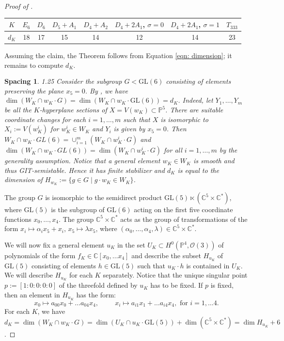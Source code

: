 \documentclass[10pt,a4paper]{amsart}
\newtheorem{spacing}{Spacing}
\newcommand{\GL}{\mathrm{GL}}
\newcommand{\bC}{\mathbb{C}}
\newcommand{\bP}{\mathbb{P}}
\newcommand{\calO}{\mathcal{O}}
\begin{document}
\begin{proof}[Proof of ]
    \begin{table}[h!]
\centering
\begin{tabular}{c|c|c|c|c|c|c|c}

$K$ & $E_6$ & $D_6$ & $D_5+A_1$& $D_4+A_2$ & $D_4+2A_1$, $\sigma=0$ & $D_4+2A_1$, $\sigma=1$ & $T_{333}$ \\ \hline
$d_K$   & 18   & 17   &  15  & 14   & 12   & 14 & 23\\ 
\end{tabular}

\label{tab: dK counts}
\end{table}
    
   Assuming the claim, the Theorem follows from Equation \ref{eqn: dimension}; it remains to compute $d_K$.
    
    \medskip
    \begin{spacing}{1.25}
    Consider the subgroup $G<\GL(6)$ consisting of elements preserving the plane $x_5=0$. By , we have $\dim(W_K\cap w_K\cdot G)=\dim(W_K\cap w_K\cdot\GL(6))=d_K$.
    Indeed, let $Y_1,\ldots,Y_m$ be all the $K$-hyperplane sections of $X=V(w_K)\subset \bP^5$. There are suitable coordinate changes for each $i=1,\ldots,m$ such that $X$ is isomorphic to $X_i:=V(w_K^i)$ for $w_K^i\in W_K$ and $Y_i$ is given by $x_5=0$. Then  $W_K\cap w_K\cdot GL(6)=\cup_{i=1}^m(W_K\cap w_K^i\cdot G)$ and $\dim(W_K\cap w_K\cdot GL(6))=\dim(W_K\cap w_K^i\cdot G)$ for all $i=1,\ldots,m$ by the generality assumption.
    Notice that a general element $w_K\in W_K$ is smooth and thus GIT-semistable. Hence it has finite stabilizer and $d_K$ is equal to the dimension of $H_{w_K}:=\{g\in G \mid g\cdot w_K\in W_K\}$.
    \end{spacing}
    
    The group $G$ is isomorphic to the semidirect product $\GL(5)\ltimes(\bC^5\times \bC^*)$, where $\GL(5)$ is the subgroup of $\GL(6)$ acting on the first five coordinate functions $x_0,\ldots,x_4$. 
    The group $\bC^5\times \bC^*$ acts as the group of transformations of the form $x_i\mapsto \alpha_ix_5+x_i$, $x_5\mapsto \lambda x_5$, where $(\alpha_0,\ldots,\alpha_4,\lambda)\in \bC^5\times \bC^*$.
    
    We will now fix a general element $u_K$ in the set $U_K\subset H^0(\bP^4,\calO(3))$ of polynomials of the form $f_K\in \bC[x_0,\dots x_4]$ and describe the subset $H_{u_K}$ of $\GL(5)$ consisting of elements $h\in\GL(5)$ such that $u_K\cdot h$ is contained in $U_K$.  We will describe $H_{u_K}$ for each $K$ separately.  
    Notice that the unique singular point $p:=[1:0:0:0:0]$ of the threefold defined by $u_K$ has to be fixed. If $p$ is fixed, then an element in $H_{u_K}$ has the form: 
    $$x_0\mapsto a_{00}x_0+\ldots a_{04}x_4, \hspace{1cm} x_i\mapsto a_{i1}x_1+\ldots a_{i4}x_4, \text{ for } i=1,\dots 4.$$ For each $K$, we have $d_K=\dim(W_K\cap w_K\cdot G)=\dim(U_K\cap u_K\cdot\GL(5))+\dim(\bC^5\times \bC^*)=\dim H_{u_K}+6$.
    

\end{proof}
\end{document}
